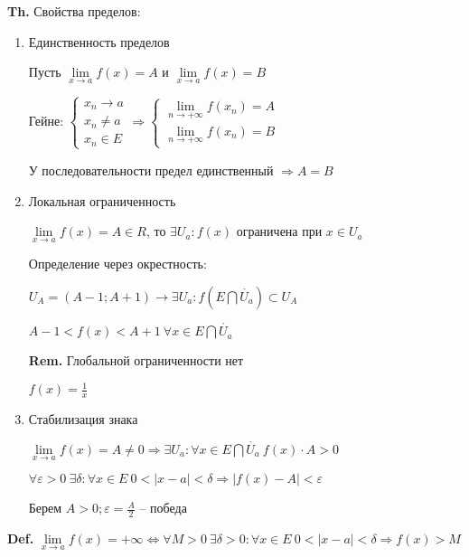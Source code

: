 \documentclass[14pt, letter paper]{article}
\begin{document}
\textbf{Th.} Свойства пределов:

\begin{enumerate}
    \item Единственность пределов

    Пусть $\lim\limits_{x \rightarrow a}{f(x)} = A$ и $\lim\limits_{x \rightarrow a}{f(x)} = B$

    Гейне: $\begin{cases}
        x_n \rightarrow a \\
        x_n \neq a \\
        x_n \in E
    \end{cases} \Rightarrow \begin{cases}
        \lim\limits_{n \rightarrow +\infty}{f(x_n)} = A \\
        \lim\limits_{n \rightarrow +\infty}{f(x_n)} = B
    \end{cases}$

    У последовательности предел единственный $\Rightarrow A = B$

    \item Локальная ограниченность

    $\lim\limits_{x \rightarrow a}{f(x)} = A \in R$, то $\exists U_a : f(x)$ ограничена при $x \in U_a$

    Определение через окрестность:

    $U_A = (A - 1; A + 1) \rightarrow \exists U_a : f(E \bigcap \mathring{U_a}) \subset U_A$

    $A - 1 < f(x) < A + 1\ \forall x \in E \bigcap \mathring{U_a}$

    \textbf{Rem.} Глобальной ограниченности нет

    $f(x) = \frac{1}{x}$

    \item Стабилизация знака

    $\lim\limits_{x \rightarrow a}{f(x)} = A \neq 0 \Rightarrow \exists U_a : \forall x \in E \bigcap \mathring{U_a}\ f(x) \cdot A > 0$

    $\forall \varepsilon > 0\ \exists \delta : \forall x \in E\ 0 < |x - a| < \delta \Rightarrow |f(x) - A| < \varepsilon$

    Берем $A > 0; \varepsilon = \frac{A}{2}$ -- победа
\end{enumerate}

\textbf{Def.} $\lim\limits_{x \rightarrow a}{f(x)} = +\infty \Leftrightarrow \forall M > 0\ \exists \delta > 0 : \forall x \in E\ 0 < |x - a| < \delta \Rightarrow f(x) > M$
\end{document}
